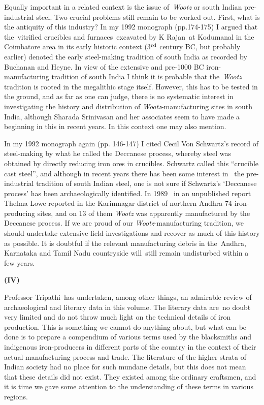 Equally important in a related context is the issue of \textit{Wootz} or south Indian pre-industrial steel. Two crucial problems still remain to be worked out. First, what is the antiquity of this industry? In my 1992 monograph (pp.174-175) I argued that the vitrified crucibles and furnaces excavated by K Rajan at Kodumanal in the Coimbatore area in its early historic context (3$^{\rm rd}$ century BC, but probably earlier) denoted the early steel-making tradition of south India as recorded by Buchanan and Heyne. In view of the extensive and pre-1000 BC iron-manufacturing tradition of south India I think it is probable that the \textit{Wootz} tradition is rooted in the megalithic stage itself. However, this has to be tested in the ground, and as far as one can judge, there is no systematic interest in investigating the history and distribution of \textit{Wootz}-manufacturing sites in south India, although Sharada Srinivasan and her associates seem to have made a beginning in this in recent years. In this context one may also mention.

In my 1992 monograph again (pp. 146-147) I cited Cecil Von Schwartz’s record of steel-making by what he called the Deccanese process, whereby steel was obtained by directly reducing iron ores in crucibles. Schwartz called this “crucible cast steel”, and although in recent years there has been some interest in  the pre-industrial tradition of south Indian steel, one is not sure if Schwartz’s ‘Deccanese process’ has been archaeologically identified. In 1989  in an unpublished report Thelma Lowe reported in the Karimnagar district of northern Andhra 74 iron-producing sites, and on 13 of them \textit{Wootz} was apparently manufactured by the Deccanese process. If we are proud of our \textit{Wootz}-manufacturing tradition, we should undertake extensive field-investigations and recover as much of this history as possible. It is doubtful if the relevant manufacturing debris in the Andhra, Karnataka and Tamil Nadu countryside will still remain undisturbed within a few years.

\vspace{-.3cm}

\begin{center}{\textbf{(IV)}}\end{center}

\vspace{-.3cm}

Professor Tripathi has undertaken, among other things, an admirable review of archaeological and literary data in this volume. The literary data are no doubt very limited and do not throw much light on the technical details of iron production. This is something we cannot do anything about, but what can be done is to prepare a compendium of various terms used by the blacksmiths and indigenous iron-producers in different parts of the country in the context of their actual manufacturing process and trade. The literature of the higher strata of Indian society had no place for such mundane details, but this does not mean that these details did not exist. They existed among the ordinary craftsmen, and it is time we gave some attention to the understanding of these terms in various regions.

